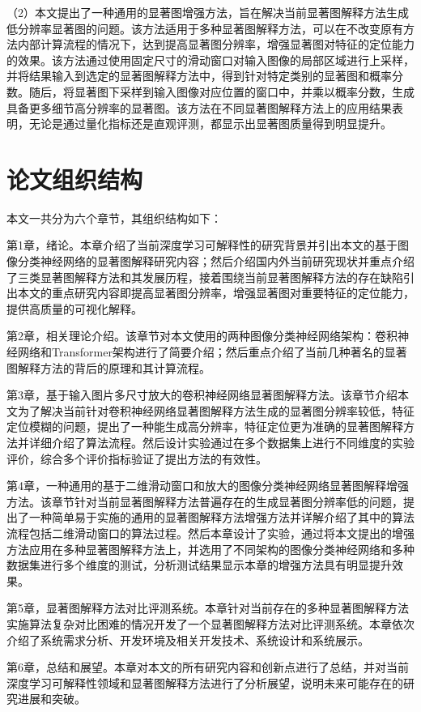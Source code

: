 （2）本文提出了一种通用的显著图增强方法，旨在解决当前显著图解释方法生成低分辨率显著图的问题。该方法适用于多种显著图解释方法，可以在不改变原有方法内部计算流程的情况下，达到提高显著图分辨率，增强显著图对特征的定位能力的效果。该方法通过使用固定尺寸的滑动窗口对输入图像的局部区域进行上采样，并将结果输入到选定的显著图解释方法中，得到针对特定类别的显著图和概率分数。随后，将显著图下采样到输入图像对应位置的窗口中，并乘以概率分数，生成具备更多细节高分辨率的显著图。该方法在不同显著图解释方法上的应用结果表明，无论是通过量化指标还是直观评测，都显示出显著图质量得到明显提升。

\section{论文组织结构} 
本文一共分为六个章节，其组织结构如下：

第1章，绪论。本章介绍了当前深度学习可解释性的研究背景并引出本文的基于图像分类神经网络的显著图解释研究内容；然后介绍国内外当前研究现状并重点介绍了三类显著图解释方法和其发展历程，接着围绕当前显著图解释方法的存在缺陷引出本文的重点研究内容即提高显著图分辨率，增强显著图对重要特征的定位能力，提供高质量的可视化解释。

第2章，相关理论介绍。该章节对本文使用的两种图像分类神经网络架构：卷积神经网络和Transformer架构进行了简要介绍；然后重点介绍了当前几种著名的显著图解释方法的背后的原理和其计算流程。

第3章，基于输入图片多尺寸放大的卷积神经网络显著图解释方法。该章节介绍本文为了解决当前针对卷积神经网络显著图解释方法生成的显著图分辨率较低，特征定位模糊的问题，提出了一种能生成高分辨率，特征定位更为准确的显著图解释方法并详细介绍了算法流程。然后设计实验通过在多个数据集上进行不同维度的实验评价，综合多个评价指标验证了提出方法的有效性。

第4章，一种通用的基于二维滑动窗口和放大的图像分类神经网络显著图解释增强方法。该章节针对当前显著图解释方法普遍存在的生成显著图分辨率低的问题，提出了一种简单易于实施的通用的显著图解释方法增强方法并详解介绍了其中的算法流程包括二维滑动窗口的算法过程。然后本章设计了实验，通过将本文提出的增强方法应用在多种显著图解释方法上，并选用了不同架构的图像分类神经网络和多种数据集进行多个维度的测试，分析测试结果显示本章的增强方法具有明显提升效果。

第5章，显著图解释方法对比评测系统。本章针对当前存在的多种显著图解释方法实施算法复杂对比困难的情况开发了一个显著图解释方法对比评测系统。本章依次介绍了系统需求分析、开发环境及相关开发技术、系统设计和系统展示。

第6章，总结和展望。本章对本文的所有研究内容和创新点进行了总结，并对当前深度学习可解释性领域和显著图解释方法进行了分析展望，说明未来可能存在的研究进展和突破。



\clearpage